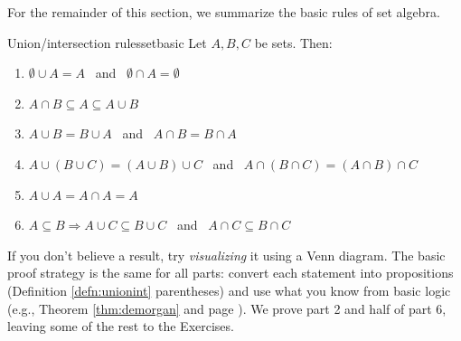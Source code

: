 For the remainder of this section, we summarize the basic rules of set algebra.

\begin{thm}{Union/intersection rules}{setbasic}
	Let $A,B,C$ be sets. Then:
	\begin{enumerate}\itemsep2pt
		\item $\emptyset\cup A=A$ \ and \ $\emptyset\cap A=\emptyset$
		\item $A\cap B\subseteq A\subseteq A\cup B$
		\item $A\cup B=B\cup A$ \ and \ $A\cap B=B\cap A$
		\item $A\cup (B\cup C)=(A\cup B)\cup C$ \ and \ $A\cap (B\cap C)=(A\cap B)\cap C$
		\item $A\cup A=A\cap A=A$
		\item $A\subseteq B\Longrightarrow A\cup C\subseteq B\cup C$ \ and \ $A\cap C\subseteq B\cap C$
	\end{enumerate}
\end{thm}

If you don't believe a result, try \emph{visualizing} it using a Venn diagram. The basic proof strategy is the same for all parts: convert each statement into propositions (Definition \ref{defn:unionint} parentheses) and use what you know from basic logic (e.g., Theorem \ref{thm:demorgan} and page \pageref{pg:asidelogicalgebra}). We prove part 2 and half of part 6, leaving some of the rest to the Exercises.


